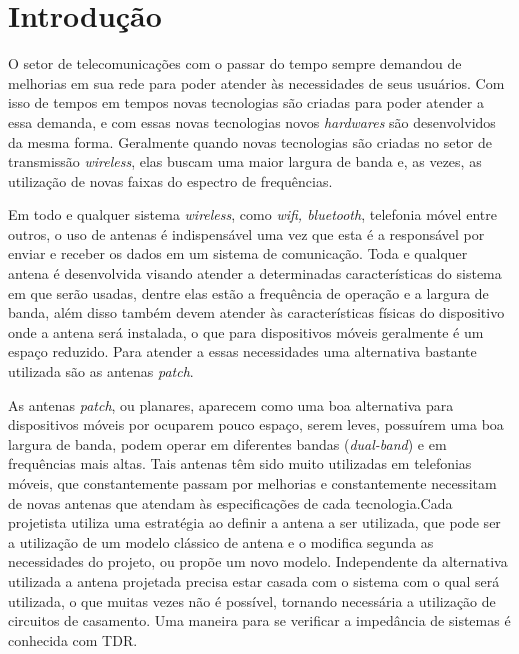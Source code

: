 \chapter*{Introdução}

O setor de telecomunicações com o passar do tempo sempre demandou de melhorias em sua rede para poder atender às necessidades de seus usuários. Com isso de tempos em tempos novas tecnologias são criadas para poder atender a essa demanda, e com essas novas tecnologias novos \textit{hardwares} são desenvolvidos da mesma forma. Geralmente quando novas tecnologias são criadas no setor de transmissão \textit{wireless}, elas buscam uma maior largura de banda e, as vezes, as utilização de novas faixas do espectro de frequências.

Em todo e qualquer sistema \textit{wireless}, como \textit{wifi, bluetooth}, telefonia móvel entre outros, o uso de antenas é indispensável uma vez que esta é a responsável por enviar e receber os dados em um sistema de comunicação. Toda e qualquer antena é desenvolvida visando atender a determinadas características do sistema em que serão usadas, dentre elas estão a frequência de operação e a largura de banda, além disso também devem atender às características físicas do dispositivo onde a antena será instalada, o que para dispositivos móveis geralmente é um espaço reduzido. Para atender a essas necessidades uma alternativa bastante utilizada são as antenas \textit{patch}.%

As antenas \textit{patch}, ou planares, aparecem como uma boa alternativa para dispositivos móveis por ocuparem pouco espaço, serem leves, possuírem uma boa largura de banda, podem operar em diferentes bandas (\textit{dual-band}) e em frequências mais altas. Tais antenas têm sido muito utilizadas em telefonias móveis, que constantemente passam por melhorias e constantemente necessitam de novas antenas que atendam às especificações de cada tecnologia.Cada projetista utiliza uma estratégia ao definir a antena a ser utilizada, que pode ser a utilização de um modelo clássico de antena e o modifica segunda as necessidades do projeto, ou propõe um novo modelo. Independente da alternativa utilizada a antena projetada precisa estar casada com o sistema com o qual será utilizada, o que muitas vezes não é possível, tornando necessária a utilização de circuitos de casamento. Uma maneira para se verificar a impedância de sistemas é conhecida com TDR. %

